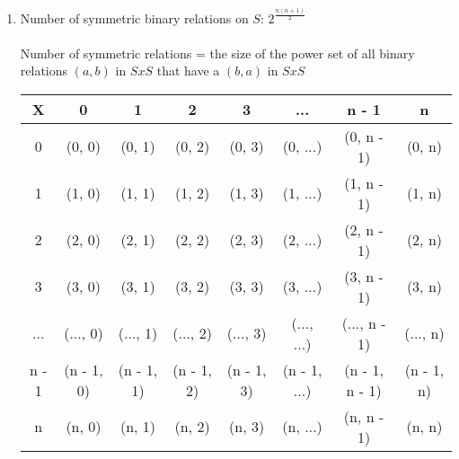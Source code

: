 \begin{enumerate}[label=(\arabic*),itemsep=.3in]
\begin{tabular}{|c |c c c c c c c|}
 		\hline
		n - 1 & \cellcolor{red!25}(n - 1, 0) & \cellcolor{red!25}(n - 1, 1) & \cellcolor{red!25}(n - 1, 2) & \cellcolor{red!25}(n - 1, 3) & \cellcolor{red!25}(n - 1, ...) & (n - 1, n - 1) &  \cellcolor{red!25}(n - 1, n)\\ 
 		\hline
		n & \cellcolor{red!25}(n, 0) & \cellcolor{red!25}(n, 1) & \cellcolor{red!25}(n, 2) & \cellcolor{red!25}(n, 3) & \cellcolor{red!25}(n, ...) & \cellcolor{red!25}(n, n - 1) & (n, n)\\ 
 		\hline
	\end{tabular}\\
\item
Number of symmetric binary relations on $S$: $2^{\frac{n(n+1)}{2}}$ \\\\
Number of symmetric relations = the size of the power set of all binary relations $(a,b)$ in $SxS$ that have a $(b,a)$ in $SxS$

\begin{tabular}{|c |c c c c c c c|} 
 		\hline
 		X & 0 & 1 & 2 & 3 &... & n - 1 & n\\ [0.5ex] 
 		\hline
 		0 & \cellcolor{blue!25}(0, 0) & (0, 1) & (0, 2) & (0, 3) & (0, ...) & (0, n - 1) & (0, n)\\ 
 		\hline
		1 & \cellcolor{red!25}(1, 0) & \cellcolor{blue!25}(1, 1) & (1, 2) & (1, 3) & (1, ...) & (1, n - 1) & (1, n)\\ 
 		\hline
		2 & \cellcolor{red!25}(2, 0) & \cellcolor{red!25}(2, 1) & \cellcolor{blue!25}(2, 2) & (2, 3) & (2, ...) & (2, n - 1) & (2, n)\\ 
 		\hline
		3 & \cellcolor{red!25}(3, 0) & \cellcolor{red!25}(3, 1) & \cellcolor{red!25}(3, 2) & \cellcolor{blue!25}(3, 3) & (3, ...) & (3, n - 1) & (3, n)\\ 
 		\hline
		... & \cellcolor{red!25}(..., 0) & \cellcolor{red!25}(..., 1) & \cellcolor{red!25}(..., 2) & \cellcolor{red!25}(..., 3) & \cellcolor{blue!25}(..., ...) & (..., n - 1) & (..., n)\\ 
 		\hline
		n - 1 & \cellcolor{red!25}(n - 1, 0) & \cellcolor{red!25}(n - 1, 1) & \cellcolor{red!25}(n - 1, 2) & \cellcolor{red!25}(n - 1, 3) & \cellcolor{red!25}(n - 1, ...) & \cellcolor{blue!25}(n - 1, n - 1) & (n - 1, n)\\ 
 		\hline
		n & \cellcolor{red!25}(n, 0) & \cellcolor{red!25}(n, 1) & \cellcolor{red!25}(n, 2) & \cellcolor{red!25}(n, 3) & \cellcolor{red!25}(n, ...) & \cellcolor{red!25}(n, n - 1) & \cellcolor{blue!25}(n, n)\\ 
 		\hline
	\end{tabular}\\\\

\end{enumerate}

\newpage
